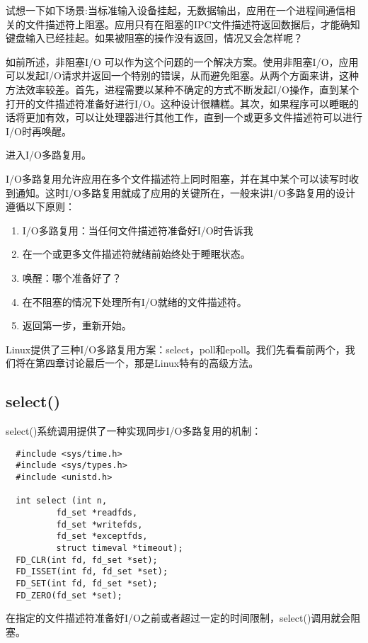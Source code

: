 试想一下如下场景:当标准输入设备挂起，无数据输出，应用在一个进程间通信相关的文件描述符上阻塞。应用只有在阻塞的IPC文件描述符返回数据后，才能确知键盘输入已经挂起。如果被阻塞的操作没有返回，情况又会怎样呢？

如前所述，非阻塞I/O 可以作为这个问题的一个解决方案。使用非阻塞I/O，应用可以发起I/O请求并返回一个特别的错误，从而避免阻塞。从两个方面来讲，这种方法效率较差。首先，进程需要以某种不确定的方式不断发起I/O操作，直到某个打开的文件描述符准备好进行I/O。这种设计很糟糕。其次，如果程序可以睡眠的话将更加有效，可以让处理器进行其他工作，直到一个或更多文件描述符可以进行I/O时再唤醒。

进入I/O多路复用。

I/O多路复用允许应用在多个文件描述符上同时阻塞，并在其中某个可以读写时收到通知。这时I/O多路复用就成了应用的关键所在，一般来讲I/O多路复用的设计遵循以下原则： 

\begin{enumerate}
\item I/O多路复用：当任何文件描述符准备好I/O时告诉我
\item 在一个或更多文件描述符就绪前始终处于睡眠状态。
\item 唤醒：哪个准备好了？
\item 在不阻塞的情况下处理所有I/O就绪的文件描述符。
\item 返回第一步，重新开始。 
\end{enumerate}

Linux提供了三种I/O多路复用方案：select，poll和epoll。我们先看看前两个，我们将在第四章讨论最后一个，那是Linux特有的高级方法。 

\subsection{select()}

select()系统调用提供了一种实现同步I/O多路复用的机制： 

\begin{lstlisting}
  #include <sys/time.h>
  #include <sys/types.h>
  #include <unistd.h>

  int select (int n,
 	      fd_set *readfds,
	      fd_set *writefds,
	      fd_set *exceptfds,
	      struct timeval *timeout);
  FD_CLR(int fd, fd_set *set);
  FD_ISSET(int fd, fd_set *set);
  FD_SET(int fd, fd_set *set);
  FD_ZERO(fd_set *set);
\end{lstlisting}

在指定的文件描述符准备好I/O之前或者超过一定的时间限制，select()调用就会阻塞。


